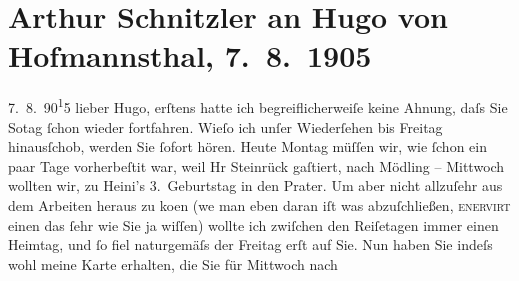 

         
         \renewcommand{\erwaehntePersonen}{Personen: Hugo von Hofmannsthal, Heinrich Schnitzler, Albert Steinrück}
         \renewcommand{\erwaehnteOrte}{Orte: Mödling, Prater, Schloß Schönbrunn, Wien, Wurstelprater}
         \renewcommand{\erwaehnteWerke}{Werke: Der Ruf des Lebens [Filmentwurf], Zwischenspiel. Komödie in drei Akten}
               \section[Arthur Schnitzler an Hugo von Hofmannsthal, 7. 8. 1905]{ Arthur Schnitzler an Hugo von Hofmannsthal, 7. 8. 1905}\nopagebreak{}\rehead{ }\begin{ledgroupsized}[t]{13cm}\normalsize\beginnumbering \toendnotes[C]{\smallbreak\pagebreak[2]} 
\toendnotes[C]{\smallbreak}\pstart
           \raggedleft{}{\pb}7. 8. 90\substVorne{}\textsuperscript{1}\substDazwischen{}5\substHinten{}\pend
           \pstart
           lieber Hugo, erſtens hatte ich begreiflicherweiſe keine Ahnung, daſs
               Sie So{\geminationn}tag{ }ſchon  wieder
               fortfahren. Wieſo ich unſer Wiederſehen bis Freitag hinausſchob, werden Sie ſofort
               hören. Heute Montag müſſen wir, wie ſchon ein paar Tage vorherbeſti{\geminationm}t war, weil Hr Steinrück gaſtiert, nach Mödling –
                  Mittwoch wollten {\pb}wir, zu Heini’s 3. Geburtstag in den Prater. Um aber nicht allzuſehr aus dem Arbeiten heraus zu ko{\geminationm}en (we{\geminationn} man eben daran iſt
               was abzuſchließen, \textsc{enervirt} einen das ſehr wie Sie ja
               wiſſen) wollte ich zwiſchen den Reiſetagen immer einen Heimtag, und ſo fiel
               naturgemäſs der Freitag erſt auf Sie. {\pb}Nun
               haben Sie indeſs wohl meine Karte erhalten, die Sie für Mittwoch nach

\end{ledgroupsized}
